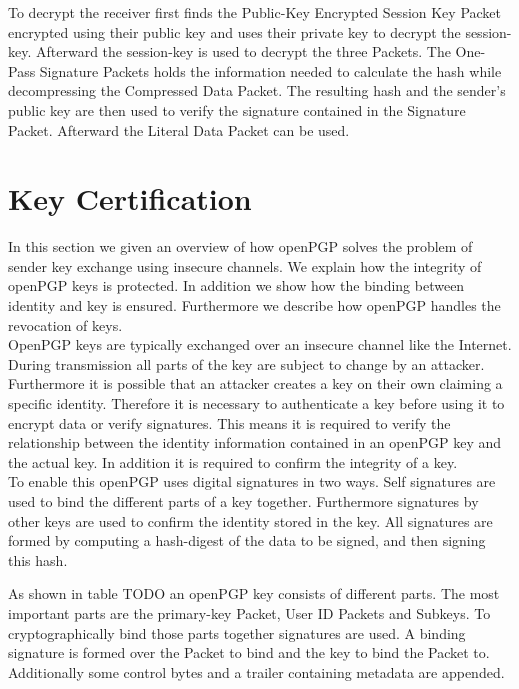 
To decrypt the receiver first finds the Public-Key Encrypted Session Key Packet encrypted using their public key and uses their private key to decrypt the session-key. Afterward the session-key is used to decrypt the three Packets. The One-Pass Signature Packets holds the information needed to calculate the hash while decompressing the Compressed Data Packet. The resulting hash and the sender's public key are then used to verify the signature contained in the Signature Packet. Afterward the Literal Data Packet can be used.

\section{Key Certification}

In this section we given an overview of how openPGP solves the problem of sender key exchange using insecure channels. We explain how the integrity of openPGP keys is protected. In addition we show how the binding between identity and key is ensured. Furthermore we describe how openPGP handles the revocation of keys. \\

OpenPGP keys are typically exchanged over an insecure channel like the Internet. During transmission all parts of the key are subject to change by an attacker. Furthermore it is possible that an attacker creates a key on their own claiming a specific identity. Therefore it is necessary to authenticate a key before using it to encrypt data or verify signatures.
This means it is required to verify the relationship between the identity information contained in an openPGP key and the actual key. In addition it is required to confirm the integrity of a key. \\

To enable this openPGP uses digital signatures in two ways. Self signatures are used to bind the different parts of a key together. Furthermore signatures by other keys are used to confirm the identity stored in the key. All signatures are formed by computing a hash-digest of the data to be signed, and then signing this hash.

As shown in table TODO an openPGP key consists of different parts. The most important parts are the primary-key Packet, User ID Packets and Subkeys. To cryptographically bind those parts together signatures are used. A binding signature is formed over the Packet to bind and the key to bind the Packet to. Additionally some control bytes and a trailer containing metadata are appended.  \\

